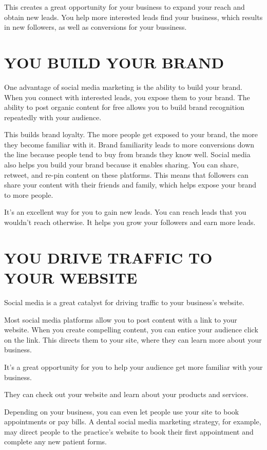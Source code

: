 \documentclass[a4paper]{article}
\begin{document}
This creates a great opportunity for your business to expand your reach and obtain new leads. You help more interested leads find your business, which results in new followers, as well as conversions for your bussiness.
   \newpage
  \section{YOU BUILD YOUR BRAND}
One advantage of social media marketing is the ability to build your brand. When you connect with interested leads, you expose them to your brand. The ability to post organic content for free allows you to build brand recognition repeatedly with your audience.

This builds brand loyalty. The more people get exposed to your brand, the more they become familiar with it. Brand familiarity leads to more conversions down the line because people tend to buy from brands they know well.
Social media also helps you build your brand because it enables sharing. You can share, retweet, and re-pin content on these platforms. This means that followers can share your content with their friends and family, which helps expose your brand to more people.

It’s an excellent way for you to gain new leads. You can reach leads that you wouldn’t reach otherwise. It helps you grow your followers and earn more leads.
 
  
  \section{ YOU DRIVE TRAFFIC TO YOUR WEBSITE}
 Social media is a great catalyst for driving traffic to your business’s website.

Most social media platforms allow you to post content with a link to your website. When you create compelling content, you can entice your audience click on the link. This directs them to your site, where they can learn more about your business.

It’s a great opportunity for you to help your audience get more familiar with your business.

They can check out your website and learn about your products and services.

Depending on your business, you can even let people use your site to book appointments or pay bills. A dental social media marketing strategy, for example, may direct people to the practice’s website to book their first appointment and complete any new patient forms.
\end{document}
